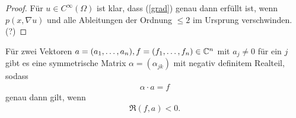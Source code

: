 \begin{proof}
Für $u \in C^\infty(\Omega)$ ist klar, dass (\ref{grad}) genau dann erfüllt ist, wenn $p(x, \nabla u)$ und alle Ableitungen der Ordnung $\le 2$ im Ursprung verschwinden. (?)
\end{proof}

\begin{lem}
	\label{lem3}
Für zwei Vektoren $a=(a_1, \ldots, a_n), f=(f_1,\ldots,f_n) \in \mathbb C^n$ mit $a_j \neq 0$ für ein $j$ gibt es eine symmetrische Matrix $\alpha = (\alpha_{jk})$ mit negativ definitem Realteil, sodass
\begin{align}
	\label{laag1}
	\alpha \cdot a = f
\end{align}
genau dann gilt, wenn
\begin{align}
	\label{laag2}
\Re (f,a) < 0.
\end{align}
\end{lem}
